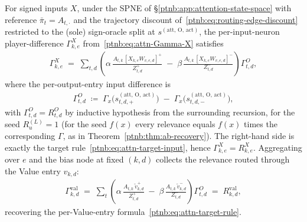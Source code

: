 \begin{theoremenv}\label{ptnb:thm:attn-ab-recovery}\label{thm:attention_ab_recovery}
For signed inputs $X$, under the SPNE of \S\ref{ptnb:app:attention-state-space} with reference
$\bar\pi_t = A_{t,\cdot}$ and the trajectory discount of~\eqref{ptnb:eq:routing-edge-discount}
restricted to the (sole) sign-oracle split at $s^{(\mathrm{att},\,\mathrm{O},\,\mathrm{act})}$, the
per-input-neuron player-difference $\Gamma^{X}_{k,e}$ from~\eqref{ptnb:eq:attn-Gamma-X} satisfies
\begin{align}\label{ptnb:eq:attn-ab-recovery}
    \Gamma^{X}_{k,e}
    \;=\;
    \sum_{t,d} \left(
    \alpha\, \frac{A_{t,k}\, [X_{k,e} W_{v,e,d}]^+}{Z_{t,d}^+}
    \;-\;
    \beta\, \frac{A_{t,k}\, [X_{k,e} W_{v,e,d}]^-}{Z_{t,d}^-}
    \right) \Gamma^{O}_{t,d},
\end{align}
where the per-output-entry input difference is
\begin{align}\label{ptnb:eq:attn-Gamma-O}
    \Gamma^{O}_{t,d} \;\coloneqq\;
    \Gamma_x\!\bigl(s_{t,d,+}^{(\mathrm{att},\,\mathrm{O},\,\mathrm{act})}\bigr) \;-\;
    \Gamma_x\!\bigl(s_{t,d,-}^{(\mathrm{att},\,\mathrm{O},\,\mathrm{act})}\bigr),
\end{align}
with $\Gamma^{O}_{t,d} = R^{O}_{t,d}$ by inductive hypothesis from the surrounding recursion, for
the seed $R^{(L)}_u = 1$ (for the seed $f(x)$ every relevance equals $f(x)$ times the corresponding
$\Gamma$, as in Theorem~\ref{ptnb:thm:ab-recovery}). The right-hand side is exactly the target
rule~\eqref{ptnb:eq:attn-target-input}, hence $\Gamma^{X}_{k,e} = R^{X}_{k,e}$. Aggregating over $e$ and
the bias node at fixed $(k,d)$ collects the relevance routed through the Value entry $v_{k,d}$:
\begin{align}\label{ptnb:eq:attn-Gamma-V-corollary}
    \Gamma^{\mathrm{val}}_{k,d}
    \;=\;
    \sum_t \left( \alpha\, \frac{A_{t,k}\, \tilde{v}_{k,d}^+}{Z_{t,d}^+} \;-\; \beta\, \frac{A_{t,k}\,
    \tilde{v}_{k,d}^-}{Z_{t,d}^-} \right) \Gamma^{O}_{t,d}
    \;=\; R^{\mathrm{val}}_{k,d},
\end{align}
recovering the per-Value-entry formula~\eqref{ptnb:eq:attn-target-rule}.
\hfill{}
\end{theoremenv}

